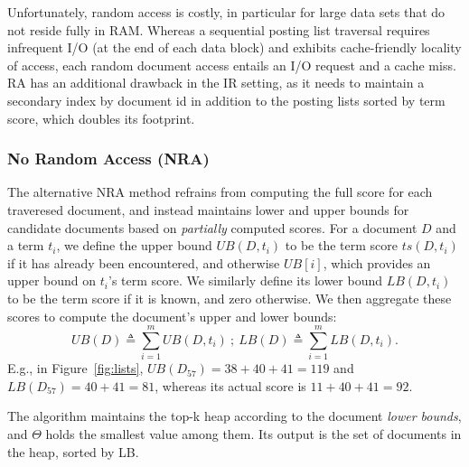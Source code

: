 Unfortunately, random access is costly,  in particular for large data sets that do not reside fully in RAM.
Whereas a sequential posting list traversal requires infrequent I/O (at the end of each data block) and exhibits cache-friendly locality of access,  each random document access entails an I/O request and a cache miss.  
RA has an additional drawback in the IR setting, as it needs to maintain a secondary index by document id in addition to the posting lists sorted by term score, which doubles its footprint. 

\subsubsection{No Random Access (NRA)} 
The alternative NRA method %
refrains from computing the full score for each traveresed document, and instead
maintains lower and upper bounds for candidate documents based on {\em partially\/} computed scores. 
For a document $D$ and a term $t_i$, we define the upper bound $UB(D, t_i)$ to be the term score $ts(D, t_i)$ if it has already been encountered, and otherwise $UB[i]$, which provides an upper bound on $t_i$'s term score. We similarly define its lower bound $LB(D, t_i)$ to be the term score if it is known, and zero otherwise. We then aggregate these scores to compute the document's upper and lower bounds:
\[
UB(D) \triangleq \sum_{i=1}^m UB(D, t_i) \ ; \  
LB(D) \triangleq \sum_{i=1}^m LB(D, t_i).
\] 
E.g., in Figure~\ref{fig:lists}, $UB(D_{57}) = 38+40+41 = 119$ and $LB(D_{57}) = 40+41 = 81$, whereas its actual score  is $11+ 40+41 = 92$.

The algorithm maintains the top-k heap according to the document \emph{lower bounds}, and $\Theta$ holds the smallest value among them. 
Its output is the set of documents in the heap, sorted by LB.

